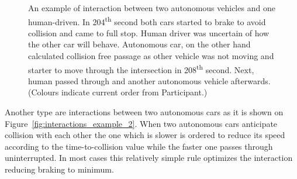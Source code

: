 \documentclass[11pt,english]{article}
\begin{document}



\begin{figure}[!] %
\caption{An example of interaction between two autonomous vehicles and one human-driven. In 204\textsuperscript{th} second both cars started to brake to avoid collision and came to full stop. Human driver was uncertain of how the other car will behave. Autonomous car, on the other hand calculated collision free passage as other vehicle was not moving and starter to move through the intersection in 208\textsuperscript{th} second. Next, human passed through and another autonomous vehicle afterwards. (Colours indicate current order from Participant.)}
\label{fig:interactions_example_1v2}
\end{figure}

Another type are interactions between two autonomous cars as it is shown on Figure~\ref{fig:interactions_example_2}. When two autonomous cars anticipate collision with each other the one which is slower is ordered to reduce its speed according to the time-to-collision value while the faster one passes through uninterrupted. In most cases this relatively simple rule optimizes the interaction reducing braking to minimum.  





\end{document}
